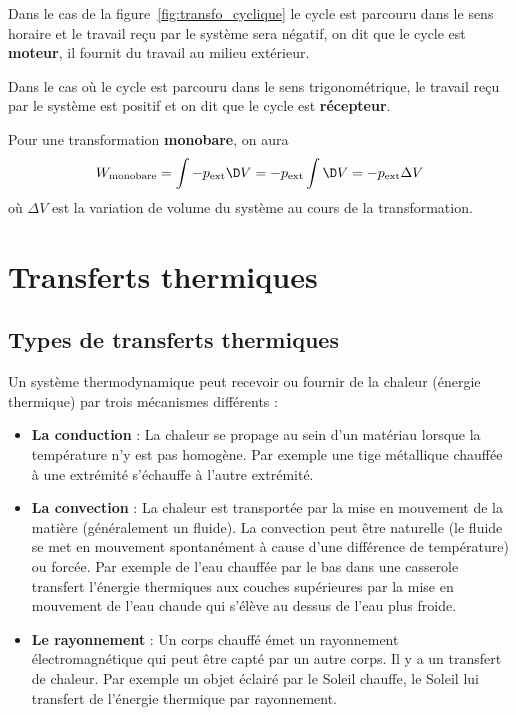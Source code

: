 \documentclass{cours}
\begin{document}
Dans le cas de la figure~\ref{fig:transfo_cyclique} le cycle est parcouru dans le sens horaire et le travail reçu par le système sera négatif, on dit que le cycle est \textbf{moteur}, il fournit du travail au milieu extérieur.

Dans le cas où le cycle est parcouru dans le sens trigonométrique, le travail reçu par le système est positif et on dit que le cycle est \textbf{récepteur}.

Pour une transformation \textbf{monobare}, on aura
\begin{equation}
  W_\text{monobare}=\int-p_\text{ext}\D V = -p_\text{ext}\int\D V = -p_\text{ext}\Delta V
\end{equation}
où $\Delta V$ est la variation de volume du système au cours de la transformation.

\section{Transferts thermiques}%
\label{sec:transferts_thermiques}
\subsection{Types de transferts thermiques}%
\label{sub:types_de_transferts_thermiques}

Un système thermodynamique peut recevoir ou fournir de la chaleur (énergie thermique)
par trois mécanismes différents :
\begin{itemize}
  \item \textbf{La conduction} : La chaleur se propage au sein d'un matériau lorsque la température n'y est pas homogène. Par exemple une tige métallique chauffée à une extrémité s'échauffe à l'autre extrémité.
  \item \textbf{La convection} : La chaleur est transportée par la mise en mouvement de la matière (généralement un fluide). La convection peut être naturelle (le fluide se met en mouvement spontanément à cause d'une différence de température) ou forcée. Par exemple de l'eau chauffée par le bas dans une casserole transfert l'énergie thermiques aux couches supérieures par la mise en mouvement de l'eau chaude qui s'élève au dessus de l'eau plus froide.
  \item \textbf{Le rayonnement} : Un corps chauffé émet un rayonnement électromagnétique qui peut être capté par un autre corps. Il y a un transfert de chaleur. Par exemple un objet éclairé par le Soleil chauffe, le Soleil lui transfert de l'énergie thermique par rayonnement.
\end{itemize}
\end{document}
